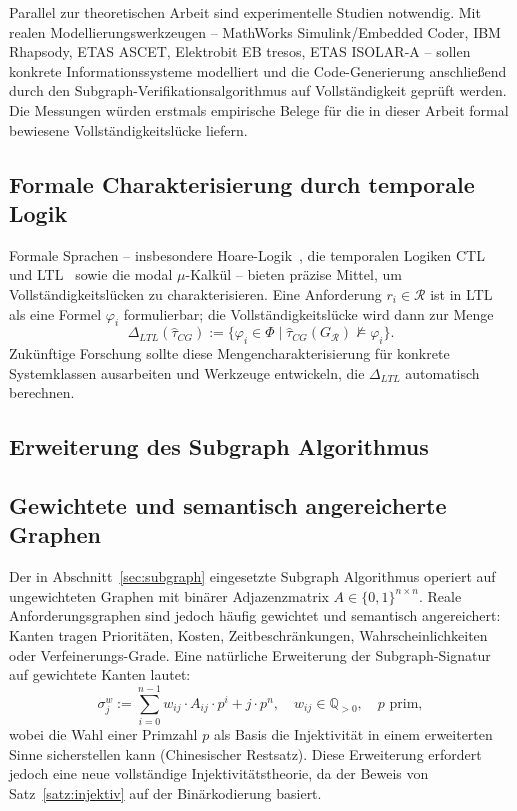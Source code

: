 ﻿\documentclass[a4paper,12pt]{report}
\theoremstyle{definition}
\begin{document}
Parallel zur theoretischen Arbeit sind experimentelle Studien notwendig.
Mit realen Modellierungswerkzeugen -- MathWorks Simulink/Embedded Coder, IBM Rhapsody,
ETAS ASCET, Elektrobit EB tresos, ETAS ISOLAR-A -- sollen konkrete Informationssysteme
modelliert und die Code-Generierung anschließend durch den Subgraph-Verifikationsalgorithmus
auf Vollständigkeit geprüft werden. Die Messungen würden erstmals empirische Belege für
die in dieser Arbeit formal bewiesene Vollständigkeitslücke liefern.

\subsection{Formale Charakterisierung durch temporale Logik}

Formale Sprachen -- insbesondere Hoare-Logik~\cite{hoare1969}, die temporalen Logiken
CTL~\cite{clarke1982} und LTL~\cite{pnueli1977} sowie die modal $\mu$-Kalkül --
bieten präzise Mittel, um Vollständigkeitslücken zu charakterisieren. Eine Anforderung
$r_i \in \mathcal{R}$ ist in LTL als eine Formel $\varphi_i$ formulierbar; die
Vollständigkeitslücke wird dann zur Menge
\[
  \Delta_{LTL}(\hat{\tau}_{CG}) :=
  \{\varphi_i \in \Phi \mid \hat{\tau}_{CG}(G_\mathcal{R}) \not\models \varphi_i\}.
\]
Zukünftige Forschung sollte diese Mengencharakterisierung für konkrete Systemklassen
ausarbeiten und Werkzeuge entwickeln, die $\Delta_{LTL}$ automatisch berechnen.

\subsection{Erweiterung des Subgraph Algorithmus}

\subsection{Gewichtete und semantisch angereicherte Graphen}

Der in Abschnitt~\ref{sec:subgraph} eingesetzte Subgraph Algorithmus operiert auf
ungewichteten Graphen mit binärer Adjazenzmatrix $A \in \{0,1\}^{n \times n}$.
Reale Anforderungsgraphen sind jedoch häufig gewichtet und semantisch angereichert:
Kanten tragen Prioritäten, Kosten, Zeitbeschränkungen, Wahrscheinlichkeiten
oder Verfeinerungs-Grade. Eine natürliche Erweiterung der Subgraph-Signatur auf
gewichtete Kanten lautet:
\[
  \sigma_j^w := \sum_{i=0}^{n-1} w_{ij} \cdot A_{ij} \cdot p^i + j \cdot p^n,
  \quad w_{ij} \in \mathbb{Q}_{>0}, \quad p \text{ prim},
\]
wobei die Wahl einer Primzahl $p$ als Basis die Injektivität in einem erweiterten
Sinne sicherstellen kann (Chinesischer Restsatz). Diese Erweiterung erfordert jedoch
eine neue vollständige Injektivitätstheorie, da der Beweis von Satz~\ref{satz:injektiv}
auf der Binärkodierung basiert.
\end{document}
